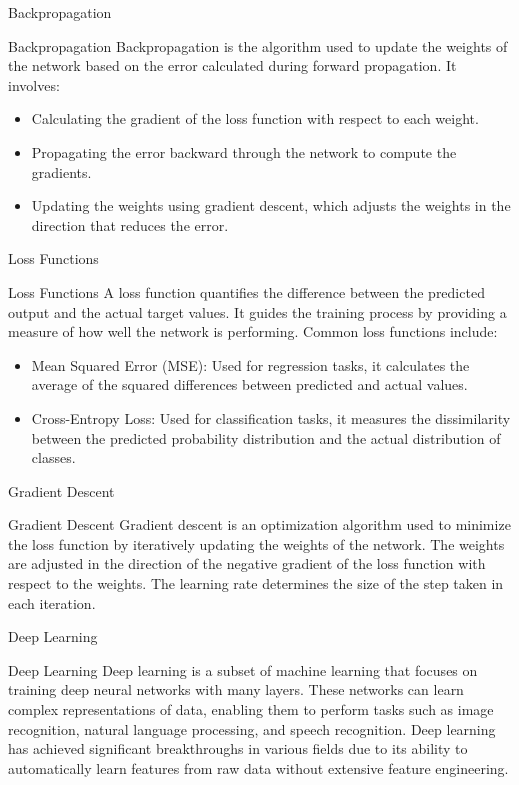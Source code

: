 \documentclass[hyperref={pdfpagelabels=false},aspectratio=169]{beamer}
\begin{document}
\begin{frame}[label={sec:orgd0ae497}]{Backpropagation}
\begin{block}{Backpropagation}
Backpropagation is the algorithm used to update the weights of the network based on the error calculated during forward propagation. It involves:
\begin{itemize}
\item Calculating the gradient of the loss function with respect to each weight.
\item Propagating the error backward through the network to compute the gradients.
\item Updating the weights using gradient descent, which adjusts the weights in the direction that reduces the error.
\end{itemize}
\end{block}
\end{frame}
\begin{frame}[label={sec:org901d280}]{Loss Functions}
\begin{block}{Loss Functions}
A loss function quantifies the difference between the predicted output and the actual target values. It guides the training process by providing a measure of how well the network is performing. Common loss functions include:
\begin{itemize}
\item \alert{Mean Squared Error (MSE)}: Used for regression tasks, it calculates the average of the squared differences between predicted and actual values.
\item \alert{Cross-Entropy Loss}: Used for classification tasks, it measures the dissimilarity between the predicted probability distribution and the actual distribution of classes.
\end{itemize}
\end{block}
\end{frame}
\begin{frame}[label={sec:orgf607122}]{Gradient Descent}
\begin{block}{Gradient Descent}
Gradient descent is an optimization algorithm used to minimize the loss function by iteratively updating the weights of the network. The weights are adjusted in the direction of the negative gradient of the loss function with respect to the weights. The learning rate determines the size of the step taken in each iteration.
\end{block}
\end{frame}
\begin{frame}[label={sec:org40c39ec}]{Deep Learning}
\begin{block}{Deep Learning}
Deep learning is a subset of machine learning that focuses on training deep neural networks with many layers. These networks can learn complex representations of data, enabling them to perform tasks such as image recognition, natural language processing, and speech recognition. Deep learning has achieved significant breakthroughs in various fields due to its ability to automatically learn features from raw data without extensive feature engineering.
\end{block}
\end{frame}
\end{document}
